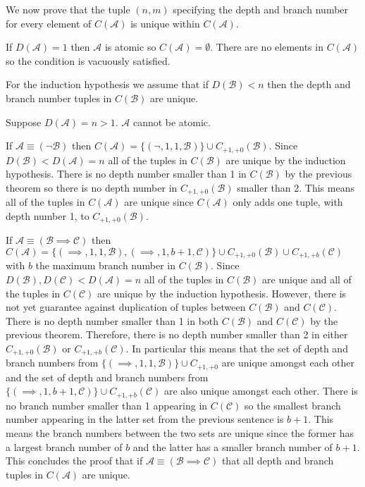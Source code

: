 \documentclass[12pt]{article}
\theoremstyle{break}
\theoremstyle{break}
\theoremstyle{break}
\theoremstyle{break}
\newcommand{\mc}[1]{\mathcal{#1}}
\begin{document}
We now prove that the tuple $(n, m)$ specifying the depth and branch number for every element of $C(\mc{A})$ is unique within $C(\mc{A})$. 

If $D(\mc{A}) = 1$ then $\mc{A}$ is atomic so $C(\mc{A}) = \emptyset$. There are no elements in $C(\mc{A})$ so the condition is vacuously satisfied.

For the induction hypothesis we assume that if $D(\mc{B}) < n$ then the depth and branch number tuples in $C(\mc{B})$ are unique.

Suppose $D(\mc{A}) = n > 1$. $\mc{A}$ cannot be atomic.

If $\mc{A} \equiv (\lnot \mc{B})$ then $C(\mc{A}) = \{(\lnot, 1, 1, \mc{B})\} \cup C_{+1, +0}(\mc{B})$. Since $D(\mc{B}) < D(\mc{A}) = n$ all of the tuples in $C(\mc{B})$ are unique by the induction hypothesis. There is no depth number smaller than 1 in $C(\mc{B})$ by the previous theorem so there is no depth number in $C_{+1, +0}(\mc{B})$ smaller than 2. This means all of the tuples in $C(\mc{A})$ are unique since $C(\mc{A})$ only adds one tuple, with depth number 1, to $C_{+1, +0}(\mc{B})$.

If $\mc{A} \equiv (\mc{B} \implies \mc{C})$ then $C(\mc{A}) = \{(\implies, 1, 1, \mc{B}), (\implies, 1, b+1, \mc{C})\} \cup C_{+1, +0}(\mc{B}) \cup C_{+1, +b}(\mc{C})$ with $b$ the maximum branch number in $C(\mc{B})$. Since $D(\mc{B}), D(\mc{C}) < D(\mc{A}) = n$ all of the tuples in $C(\mc{B})$ are unique and all of the tuples in $C(\mc{C})$ are unique by the induction hypothesis. However, there is not yet guarantee against duplication of tuples between $C(\mc{B})$ and $C(\mc{C})$. There is no depth number smaller than 1 in both $C(\mc{B})$ and $C(\mc{C})$ by the previous theorem. Therefore, there is no depth number smaller than 2 in either $C_{+1, +0}(\mc{B})$ or $C_{+1, +b}(\mc{C})$. In particular this means that the set of depth and branch numbers from $\{(\implies, 1, 1, \mc{B})\} \cup C_{+1, +0}$ are unique amongst each other and the set of depth and branch numbers from $\{(\implies, 1, b+1, \mc{C})\} \cup C_{+1, +b}(\mc{C})$ are also unique amongst each other. There is no branch number smaller than 1 appearing in $C(\mc{C})$ so the smallest branch number appearing in the latter set from the previous sentence is $b+1$. This means the branch numbers between the two sets are unique since the former has a largest branch number of $b$ and the latter has a smaller branch number of $b+1$. This concludes the proof that if $\mc{A} \equiv (\mc{B} \implies \mc{C})$ that all depth and branch tuples in $C(\mc{A})$ are unique.
\end{document}
